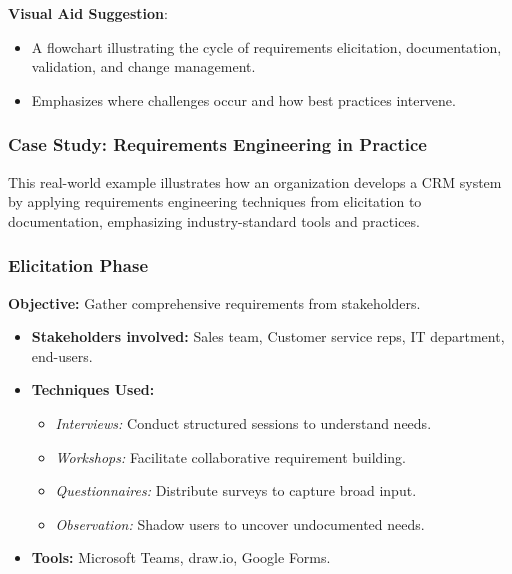\documentclass{beamer}
\begin{document}
\begin{frame}[fragile]
    \textbf{Visual Aid Suggestion}:
    \begin{itemize}
        \item A flowchart illustrating the cycle of requirements elicitation, documentation, validation, and change management.
        \item Emphasizes where challenges occur and how best practices intervene.
    \end{itemize}
\end{frame}

\begin{frame}[fragile]
  \frametitle{Case Study: Requirements Engineering in Practice}
  This real-world example illustrates how an organization develops a CRM system by applying requirements engineering techniques from elicitation to documentation, emphasizing industry-standard tools and practices.
\end{frame}

\begin{frame}[fragile]
  \frametitle{Elicitation Phase}
  \textbf{Objective:} Gather comprehensive requirements from stakeholders.
  \begin{itemize}
    \item \textbf{Stakeholders involved:} Sales team, Customer service reps, IT department, end-users.
    \item \textbf{Techniques Used:}
    \begin{itemize}
      \item \textit{Interviews:} Conduct structured sessions to understand needs.
      \item \textit{Workshops:} Facilitate collaborative requirement building.
      \item \textit{Questionnaires:} Distribute surveys to capture broad input.
      \item \textit{Observation:} Shadow users to uncover undocumented needs.
    \end{itemize}
    \item \textbf{Tools:} Microsoft Teams, draw.io, Google Forms.
  \end{itemize}
\end{frame}
\end{document}
